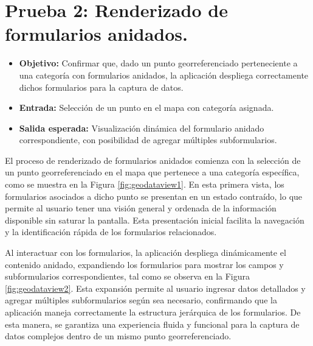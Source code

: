 \documentclass[12pt, a4paper]{book}
\begin{document}
\section{Prueba 2: Renderizado de formularios anidados.}
\begin{itemize}
  \item \textbf{Objetivo:} Confirmar que, dado un punto georreferenciado perteneciente a una categoría con formularios anidados, la aplicación despliega correctamente dichos formularios para la captura de datos.
  \item \textbf{Entrada:} Selección de un punto en el mapa con categoría asignada.
  \item \textbf{Salida esperada:} Visualización dinámica del formulario anidado correspondiente, con posibilidad de agregar múltiples subformularios.
\end{itemize}

El proceso de renderizado de formularios anidados comienza con la selección de un punto georreferenciado en el mapa que pertenece a una categoría específica, como se muestra en la Figura \ref{fig:geodataview1}. En esta primera vista, los formularios asociados a dicho punto se presentan en un estado contraído, lo que permite al usuario tener una visión general y ordenada de la información disponible sin saturar la pantalla. Esta presentación inicial facilita la navegación y la identificación rápida de los formularios relacionados.

Al interactuar con los formularios, la aplicación despliega dinámicamente el contenido anidado, expandiendo los formularios para mostrar los campos y subformularios correspondientes, tal como se observa en la Figura \ref{fig:geodataview2}. Esta expansión permite al usuario ingresar datos detallados y agregar múltiples subformularios según sea necesario, confirmando que la aplicación maneja correctamente la estructura jerárquica de los formularios. De esta manera, se garantiza una experiencia fluida y funcional para la captura de datos complejos dentro de un mismo punto georreferenciado.
\end{document}
